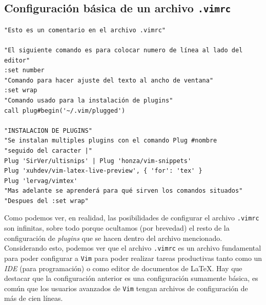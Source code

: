 \documentclass[10pt]{article}
\begin{document}
\subsection{Configuración básica de un archivo \texttt{.vimrc}}
\begin{verbatim}
"Esto es un comentario en el archivo .vimrc"

"El siguiente comando es para colocar numero de línea al lado del editor"
:set number 
"Comando para hacer ajuste del texto al ancho de ventana"
:set wrap
"Comando usado para la instalación de plugins"
call plug#begin('~/.vim/plugged')

"INSTALACION DE PLUGINS"
"Se instalan multiples plugins con el comando Plug #nombre
"seguido del caracter |"
Plug 'SirVer/ultisnips' | Plug 'honza/vim-snippets'
Plug 'xuhdev/vim-latex-live-preview', { 'for': 'tex' }
Plug 'lervag/vimtex'
"Mas adelante se aprenderá para qué sirven los comandos situados"
"Despues del :set wrap"
\end{verbatim}
Como podemos ver, en realidad, las posibilidades de configurar el archivo \texttt{.vimrc} son infinitas, sobre todo porque ocultamos (por brevedad) el resto de la configuración de \textit{plugins} que se hacen dentro del archivo mencionado.
Considerando esto, podemos ver que el archivo \texttt{.vimrc} es un archivo fundamental para poder configurar a \texttt{Vim} para poder realizar tareas productivas tanto como un \textit{IDE} (para programación) o como editor de documentos de \LaTeX.
Hay que destacar que la configuración anterior es una configuración sumamente básica, es común que los usuarios avanzados de \texttt{Vim} tengan archivos de configuración de más de cien líneas. 
\end{document}
